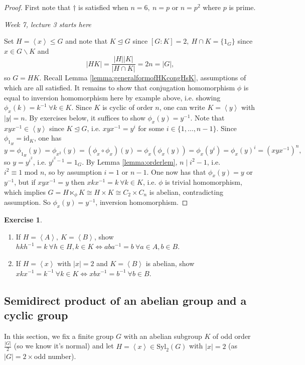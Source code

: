 \documentclass[a4paper]{article}
\newcommand{\la}{\left\langle}
\newcommand{\ra}{\right\rangle}
\newcommand{\Syl}{\text{Syl}}
\newcommand{\id}{\text{id}}
\newcommand{\Mod}{\text{ mod }}
\theoremstyle{definition}
\newtheorem{exe}[defn]{Exercise}
\begin{document}
\begin{proof}
First note that $\dagger$ is satisfied when $n=6,\ n=p$ or $n=p^2$ where $p$ is prime.

\begin{flushright}
\textit{Week 7, lecture 3 starts here}
\end{flushright}

Set $H=\la x\ra\leq G$ and note that $K\unlhd G$ since $[G:K]=2,\ H\cap K=\{1_G\}$ since $x\in G\backslash K$ and
\[
|HK|=\frac{|H||K|}{|H\cap K|}=2n=|G|,
\]
so $G=HK$. Recall Lemma \ref{lemma:generalformofHKcongHsK}, assumptions of which are all satisfied. It remains to show that conjugation homomorphism $\phi$ is equal to inversion homomorphism here by example above, i.e. showing $\phi_x(k)=k^{-1} \ \forall k\in K$. Since $K$ is cyclic of order $n$, one can write $K=\la y\ra$ with $|y|=n$. By exercises below, it suffices to show $\phi_x(y)=y^{-1}$. Note that $xyx^{-1}\in \la y\ra$ since $K\unlhd G$, i.e. $xyx^{-1}=y^i$ for some $i\in\{1,\ldots,n-1\}$. Since $\phi_{1_H}=\id_K$, one has
\[
y=\phi_{1_H}(y)=\phi_{x^2}(y)=(\phi_x\circ \phi_x)(y)=\phi_x(\phi_x(y))=\phi_x(y^i)=\phi_x(y)^i=(xyx^{-1})^n,
\]
so $y=y^{i^2}$, i.e. $y^{i^2-1}=1_G$. By Lemma \ref{lemma:orderlem}, $n\mid i^2-1$, i.e. $i^2\equiv 1\Mod n$, so by assumption $i=1$ or $n-1$. One now has that $\phi_x(y)=y$ or $y^{-1}$, but if $xyx^{-1}=y$ then $xkx^{-1}=k \ \forall k\in K$, i.e. $\phi$ is trivial homomorphism, which implies $G=H\ltimes_\phi K\cong H\times K\cong C_2\times C_n$ is abelian, contradicting assumption. So $\phi_x(y)=y^{-1}$, inversion homomorphism.
\end{proof}

\begin{exe}
\begin{enumerate}
\item If $H=\la A\ra,\ K=\la B\ra$, show $hkh^{-1}=k \ \forall h\in H,k\in K\Leftrightarrow aba^{-1}=b \ \forall a\in A,b\in B$.
\item If $H=\la x\ra$ with $|x|=2$ and $K=\la B\ra$ is abelian, show $xkx^{-1}=k^{-1} \ \forall k\in K\Leftrightarrow xbx^{-1}=b^{-1} \ \forall b\in B$.
\end{enumerate}
\end{exe}

\subsection{Semidirect product of an abelian group and a cyclic group}
In this section, we fix a finite group $G$ with an abelian subgroup $K$ of odd order $\frac{|G|}{2}$ (so we know it's normal) and let $H=\la x\ra\in\Syl_2(G)$ with $|x|=2$ (as $|G|=2\times$odd number).
\end{document}
